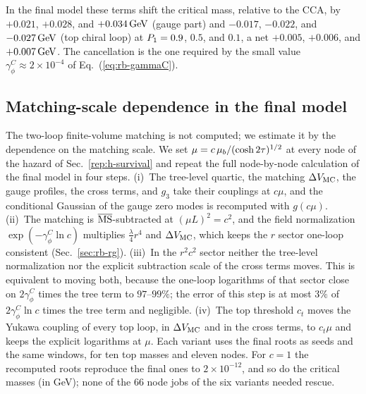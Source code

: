 In the final model these terms shift the critical mass, relative to the CCA, by $+0.021$, $+0.028$, and $+0.034\,\mathrm{GeV}$ (gauge part) and $-0.017$, $-0.022$, and $-0.027\,\mathrm{GeV}$ (top chiral loop) at $P_1=0.9$, $0.5$, and $0.1$, a net $+0.005$, $+0.006$, and $+0.007\,\mathrm{GeV}$. %
The cancellation is the one required by the small value $\gamma_\phi^C\approx2\times10^{-4}$ of Eq.~(\ref{eq:rb-gammaC}). %

\subsection{Matching-scale dependence in the final model}
\label{sec:rb-scale}

The two-loop finite-volume matching is not computed; we estimate it by the dependence on the matching scale.
We set $\mu=c\,\mu_b/(\cosh2\tau)^{1/2}$ at every node of the hazard of Sec.~\ref{rep:h-survival} and repeat the full node-by-node calculation of the final model in four steps.
(i)~The tree-level quartic, the matching $\Delta V_{\rm MC}$, the gauge profiles, the cross terms, and $g_3$ take their couplings at $c\mu$, and the conditional Gaussian of the gauge zero modes is recomputed with $g(c\mu)$.
(ii)~The matching is $\overline{\mathrm{MS}}$-subtracted at $(\mu L)^2=c^2$, and the field normalization $\exp(-\gamma_\phi^C\ln c)$ multiplies $\frac\lambda4r^4$ and $\Delta V_{\rm MC}$, which keeps the $r$ sector one-loop consistent (Sec.~\ref{sec:rb-rg}).
(iii)~In the $r^2c^2$ sector neither the tree-level normalization nor the explicit subtraction scale of the cross terms moves.
This is equivalent to moving both, because the one-loop logarithms of that sector close on $2\gamma_\phi^C$ times the tree term to $97$--$99\%$; the error of this step is at most $3\%$ of $2\gamma_\phi^C\ln c$ times the tree term and negligible. %
(iv)~The top threshold $c_t$ moves the Yukawa coupling of every top loop, in $\Delta V_{\rm MC}$ and in the cross terms, to $c_t\mu$ and keeps the explicit logarithms at $\mu$.
Each variant uses the final roots as seeds and the same windows, for ten top masses and eleven nodes.
For $c=1$ the recomputed roots reproduce the final ones to $2\times10^{-12}$, and so do the critical masses (in GeV); none of the 66 node jobs of the six variants needed rescue. %

